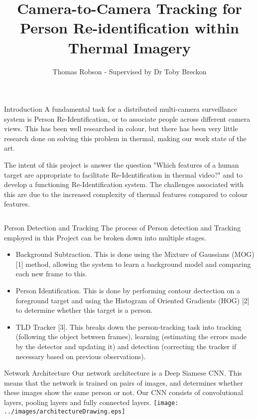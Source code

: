 \documentclass[final]{beamer}
\title[Thermal Re-ID]{Camera-to-Camera Tracking for Person Re-identification within Thermal Imagery}
\author[G Ingram]{Thomas Robson - Supervised by Dr Toby Breckon}
\institute[Durham]{School of Computer Science, Durham University}
\begin{document}
  \begin{frame}{} 

  \vfill
  \begin{block}{Introduction}
          A fundamental task for a distributed multi-camera surveillance system is Person Re-Identification, or to associate people across different camera views. This has been well researched in colour, but there has been very little research done on solving this problem in thermal, making our work state of the art. 

The intent of this project is answer the question "Which features of a human target are appropriate to facilitate Re-Identification in thermal video?" and to develop a functioning Re-Identification system. The challenges associated with this are due to the increased complexity of thermal features compared to colour features.
        \end{block}
        
    \begin{columns}[t]
      \begin{column}{.49\linewidth}
        
        \begin{block}{Person Detection and Tracking}
        	The process of Person detection and Tracking employed in this Project can be broken down into multiple stages. 
        	\begin{itemize}
        	\item Background Subtraction. This is done using the Mixture of Gaussians (MOG) [1] method, allowing the system to learn a background model and comparing each new frame to this. 

        	\item Person Identification. This is done by performing contour dectection on a foreground target and using the Histogram of Oriented Gradients (HOG) [2] to determine whether this target is a person.
        	
        	\item TLD Tracker [3]. This breaks down the person-tracking task into tracking (following the object between frames), learning (estimating the errors made by the detector and updating it) and detection (correcting the tracker if necessary based on previous observations). 
          \end{itemize}
        \end{block}
       


        \begin{block}{Network Architecture}
        Our network architecture is a Deep Siamese CNN. This means that the network is trained on pairs of images, and determines whether these images show the same person or not. Our CNN consists of convolutional layers, pooling layers and fully connected layers. 
        \texttt{[image: ../images/architectureDrawing.eps]}
        \end{block}
	

\end{column}
\end{columns}
\end{frame}
\end{document}
